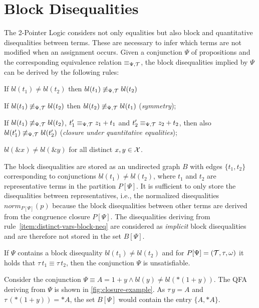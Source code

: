 \section{Block Disequalities}\label{section:block-disequalities}

The 2-Pointer Logic considers not only equalities but also block and quantitative disequalities between terms.
These are necessary to infer which terms are not
modified when an assignment occurs.
Given a conjunction $\Psi$ of propositions and the corresponding equivalence relation $\equiv_{\Psi,\mathcal{T}}$, the block disequalities implied by $\Psi$ can be derived by the following rules:\cite{new-paper-todo}

\begin{enumerate}[label={[B\arabic*]}, ref={[B\arabic*]}]
    \setcounter{enumi}{-1} %
    \item If $bl(t_1)\neq bl(t_2)$ then $bl(t_1)\not\equiv_{\Psi,\mathcal{T}} bl(t_2)$
    \item If $bl(t_1)\not\equiv_{\Psi,\mathcal{T}} bl(t_2)$ then $bl(t_2)\not\equiv_{\Psi,\mathcal{T}} bl(t_1)$
          (\emph{symmetry});
          \item\label{item:closure-under-quantitative-equalities}
          If $bl(t_1)\not\equiv_{\Psi,\mathcal{T}} bl(t_2)$, $t'_1 \equiv_{\Psi,\mathcal{T}} z_1+t_1$ and $t'_2\equiv_{\Psi,\mathcal{T}} z_2+t_2$, then
          also $bl(t'_1)\not\equiv_{\Psi,\mathcal{T}} bl(t'_2)$ (\emph{closure under quantitative equalities});
          \item\label{item:distinct-vars-block-neq} $bl(\&x) \neq bl(\&y)$ for all distinct $x, y \in \mathcal{X}$.
\end{enumerate}

The block disequalities are stored as an undirected graph $B$
with edges $\{t_1,t_2\}$ corresponding to conjunctions $bl(t_1) \neq bl(t_2)$,
where $t_1$ and $t_2$ are representative terms in the partition $P[\Psi]$.
It is sufficient to only store the disequalities between representatives, i.e.,
the normalized disequalities $norm_{P[\Psi]}(p)$ because
the block disequalities between other terms are derived from the congruence closure $P[\Psi]$.
The disequalities deriving from rule~\ref{item:distinct-vars-block-neq} are considered as \emph{implicit} block disequalities and are therefore not stored in the set $B[\Psi]$.

If $\Psi$ contains a block disequality $bl(t_1) \neq bl(t_2)$ and for $P[\Psi] = (\mathcal{T}, \tau, \omega)$ it holds that
$\tau\,t_1 \equiv \tau\,t_2$, then the conjunction $\Psi$ is unsatisfiable.

\begin{example}\label{ex:bldiseq}
    Consider the conjunction $\Psi \equiv A = 1 + y \land bl(y) \neq bl(*(1 + y))$.
    The QFA deriving from $\Psi$ is shown in \cref{fig:closure-example}.
    As $\tau\,y = A$ and $\tau\,(*(1+y)) = *A$, the set $B[\Psi]$ would contain the entry $\{A,*A\}$.
\end{example}

